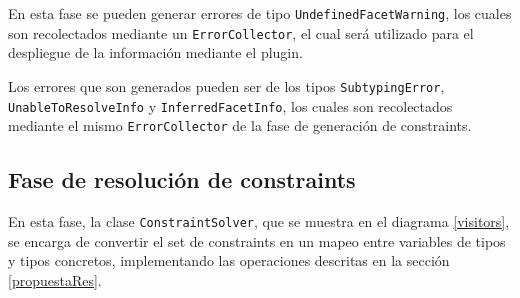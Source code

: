 En esta fase se pueden generar errores de tipo \texttt{UndefinedFacetWarning}, los cuales son recolectados mediante un \texttt{ErrorCollector}, el cual será utilizado para el despliegue de la información mediante el plugin.

Los errores que son generados pueden ser de los tipos \texttt{SubtypingError}, \texttt{UnableToResolveInfo} y \texttt{InferredFacetInfo}, los cuales son recolectados mediante el mismo \texttt{ErrorCollector} de la fase de generación de constraints.

\subsection{Fase de resolución de constraints}
En esta fase, la clase \texttt{ConstraintSolver}, que se muestra en el diagrama \ref{visitors}, se encarga de convertir el set de constraints en un mapeo entre variables de tipos y tipos concretos, implementando las operaciones descritas en la sección \ref{propuestaRes}.

